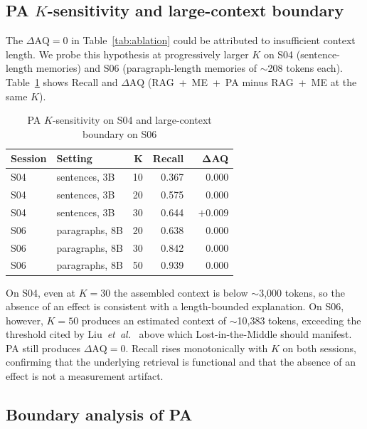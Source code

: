 \documentclass[conference]{IEEEtran}
\begin{document}
\subsection{PA $K$-sensitivity and large-context boundary}

The $\Delta\mathrm{AQ}=0$ in Table~\ref{tab:ablation} could be attributed to insufficient context length. We probe this hypothesis at progressively larger $K$ on S04 (sentence-length memories) and S06 (paragraph-length memories of $\sim$208 tokens each). Table~\ref{tab:pa} shows Recall and $\Delta\mathrm{AQ}$ (RAG~+~ME~+~PA minus RAG~+~ME at the same $K$).

\begin{table}[t]
\caption{PA $K$-sensitivity on S04 and large-context boundary on S06}
\label{tab:pa}
\centering
\renewcommand{\arraystretch}{1.05}
\begin{tabular}{@{}llrrr@{}}
\toprule
\textbf{Session} & \textbf{Setting} & $\boldsymbol{K}$ & \textbf{Recall} & $\boldsymbol{\Delta}$\textbf{AQ} \\
\midrule
S04 & sentences, 3B & 10 & 0.367 & $\phantom{+}0.000$ \\
S04 & sentences, 3B & 20 & 0.575 & $\phantom{+}0.000$ \\
S04 & sentences, 3B & 30 & 0.644 & $+0.009$           \\
S06 & paragraphs, 8B & 20 & 0.638 & $\phantom{+}0.000$ \\
S06 & paragraphs, 8B & 30 & 0.842 & $\phantom{+}0.000$ \\
S06 & paragraphs, 8B & 50 & 0.939 & $\phantom{+}0.000$ \\
\bottomrule
\end{tabular}
\end{table}

On S04, even at $K{=}30$ the assembled context is below $\sim$3{,}000 tokens, so the absence of an effect is consistent with a length-bounded explanation. On S06, however, $K{=}50$ produces an estimated context of $\sim$10{,}383 tokens, exceeding the threshold cited by Liu~\emph{et~al.}~\cite{liu2023lost} above which Lost-in-the-Middle should manifest. PA still produces $\Delta\mathrm{AQ}=0$. Recall rises monotonically with $K$ on both sessions, confirming that the underlying retrieval is functional and that the absence of an effect is not a measurement artifact.

\subsection{Boundary analysis of PA}
\end{document}
